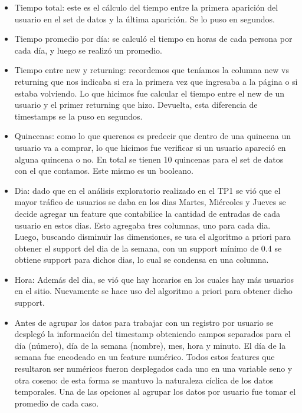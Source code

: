 \documentclass[a4paper]{article}
\begin{document}
        \begin{itemize}
            \item Tiempo total: este es el cálculo del tiempo entre la primera aparición del usuario en el set de datos y la última aparición. Se lo puso en segundos.\\
            
            \item Tiempo promedio por día: se calculó el tiempo en horas de cada persona por cada día, y luego se realizó un promedio.\\
            
            \item Tiempo entre new y returning: recordemos que teníamos la columna new vs returning que nos indicaba si era la primera vez que ingresaba a la página o si estaba volviendo. Lo que hicimos fue calcular el tiempo entre el new de un usuario y el primer returning que hizo. Devuelta, esta diferencia de timestamps se la puso en segundos.\\
            
            \item Quincenas: como lo que querenos es predecir que dentro de una quincena un usuario va a comprar, lo que hicimos fue verificar si un usuario apareció en alguna quincena o no. En total se tienen 10 quincenas para el set de datos con el que contamos. Este mismo es un booleano.\\
            
            \item Dia: dado que en el análisis exploratorio realizado en el TP1 se vió que el mayor tráfico de usuarios se daba en los dias Martes, Miércoles y Jueves se decide agregar un feature que contabilice la cantidad de entradas de cada usuario en estos dias. Esto agregaba tres columnas, uno para cada dia.\\
            Luego, buscando disminuir las dimensiones, se usa el algoritmo a priori para obtener el support del dia de la semana, con un support mínimo de 0.4 se obtiene support para dichos dias, lo cual se condensa en una columna.
            
            \item Hora: Además del dia, se vió que hay horarios en los cuales hay más usuarios en el sitio. Nuevamente se hace uso del algoritmo a priori para obtener dicho support.
            
            \item Antes de agrupar los datos para trabajar con un registro por usuario se desplegó la información del timestamp obteniendo campos separados para el día (número), día de la semana (nombre), mes, hora y minuto. El día de la semana fue encodeado en un feature numérico. Todos estos features que resultaron ser numéricos fueron desplegados cada uno en una variable seno y otra coseno: de esta forma se mantuvo la naturaleza cíclica de los datos temporales. Una de las opciones al agrupar los datos por usuario fue tomar el promedio de cada caso.
        \end{itemize}
       
\end{document}
